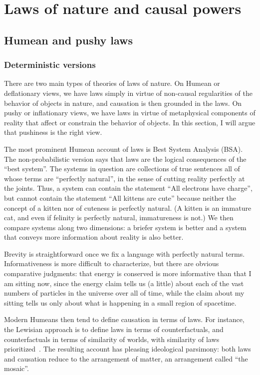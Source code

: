 \def\mychapter{VIII}


\chapter{Laws of nature and causal powers}\label{ch:laws}
\section{Humean and pushy laws}
\subsection{Deterministic versions}
There are two main types of theories of laws of nature. On Humean or deflationary views, we have laws simply in virtue of non-causal 
regularities of the behavior of objects in nature, and causation is then grounded in the laws. On pushy or inflationary views, 
we have laws in virtue of metaphysical components of reality that affect or constrain the behavior of objects. 
In this section, I will argue that pushiness is the right view. 

The most prominent Humean account of laws is  Best System Analysis (BSA). The non-probabilistic version says that laws are the 
logical consequences of the ``best system''. The systems in question are collections of true sentences all of whose terms
are ``perfectly natural'', in the sense of cutting reality perfectly at the joints. Thus, a system can contain the statement ``All electrons have charge'', but cannot contain
the statement ``All kittens are cute'' because
neither the concept of a kitten nor of cuteness is perfectly natural. (A kitten is an immature cat, and even if 
felinity is perfectly natural, immatureness is not.) We then compare systems along two dimensions:
a briefer system is better and a system that conveys more information about reality is also better.

Brevity is straightforward once we fix a language with perfectly natural terms. Informativeness is more difficult 
to characterize, but there are obvious comparative judgments: that energy is conserved is more informative than that
I am sitting now, since the energy claim tells us (a little) about each of the vast numbers of particles in the universe 
over all of time, while the claim about my sitting tells us only about what is happening in a small region of spacetime. 

Modern Humeans then tend to define causation in terms of laws. For instance, the Lewisian approach is to define laws
in terms of counterfactuals, and counterfactuals in terms of similarity of worlds, with similarity of laws prioritized~\parencite{LewisArrow1979,LewisCounterfactuals}.
The resulting account has pleasing ideological parsimony: both laws and causation reduce to the arrangement of matter,
an arrangement called ``the mosaic''.

